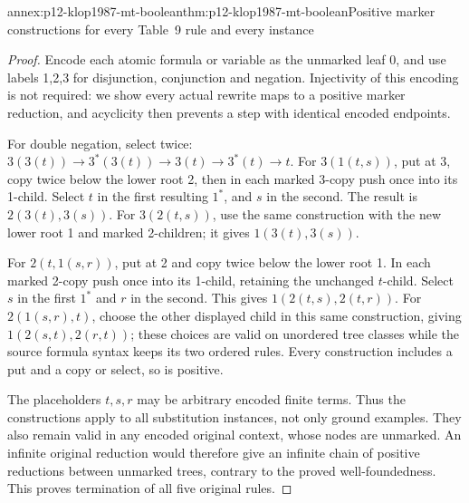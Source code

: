 \begin{annexitem}{annex:p12-klop1987-mt-boolean}{thm:p12-klop1987-mt-boolean}{Positive marker constructions for every Table~9 rule and every instance}
\begin{proof}
Encode each atomic formula or variable as the unmarked leaf 0, and
use labels 1,2,3 for disjunction, conjunction and negation. Injectivity
of this encoding is not required: we show every actual rewrite maps
to a positive marker reduction, and acyclicity then prevents a step
with identical encoded endpoints.

For double negation, select twice:
\(3(3(t))\to3^*(3(t))\to3(t)\to3^*(t)\to t\).
For \(3(1(t,s))\), put at 3, copy twice below the lower root 2,
then in each marked 3-copy push once into its 1-child. Select \(t\)
in the first resulting \(1^*\), and \(s\) in the second.
The result is \(2(3(t),3(s))\).
For \(3(2(t,s))\), use the same construction with the new lower
root 1 and marked 2-children; it gives \(1(3(t),3(s))\).

For \(2(t,1(s,r))\), put at 2 and copy twice below the lower
root 1. In each marked 2-copy push once into its 1-child, retaining
the unchanged \(t\)-child. Select \(s\) in the first \(1^*\)
and \(r\) in the second. This gives
\(1(2(t,s),2(t,r))\). For \(2(1(s,r),t)\), choose the other
displayed child in this same construction, giving
\(1(2(s,t),2(r,t))\); these choices are valid on unordered tree
classes while the source formula syntax keeps its two ordered rules.
Every construction includes a put and a copy or select, so is positive.

The placeholders \(t,s,r\) may be arbitrary encoded finite terms.
Thus the constructions apply to all substitution instances, not only
ground examples. They also remain valid in any encoded original
context, whose nodes are unmarked. An infinite original reduction
would therefore give an infinite chain of positive reductions between
unmarked trees, contrary to the proved well-foundedness. This proves
termination of all five original rules.
\end{proof}
\end{annexitem}

